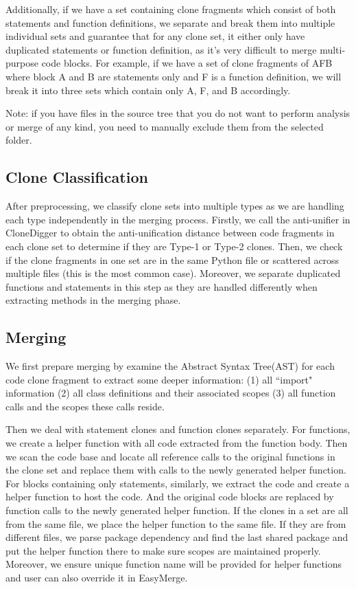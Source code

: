 \documentclass{acm_proc_article-sp}
\begin{document}
Additionally, if we have a set containing clone fragments which consist of both statements and function definitions, we separate and break them into multiple individual sets and guarantee that for any clone set, it either only have duplicated statements or function definition, as it's very difficult to merge multi-purpose code blocks.
For example, if we have a set of clone fragments of AFB where block A and B are statements only and F is a function definition, we will break it into three sets which
contain only A, F, and B accordingly.

Note: if you have files in the source tree that you do not want to perform analysis or merge of any kind, you need to manually exclude them from the selected folder.

\subsection{Clone Classification}
After preprocessing, we classify clone sets into multiple types as we are handling each type independently in the merging process. Firstly,
we call the anti-unifier in CloneDigger to obtain the anti-unification distance between code fragments in each clone set to determine if they
are Type-1 or Type-2 clones. Then, we check if the clone fragments in one set are in the same Python file or scattered across multiple files (this is the most common case).
Moreover, we separate duplicated functions and statements in this step as they are handled differently when extracting methods in the merging phase.

\subsection{Merging}
We first prepare merging by examine the Abstract Syntax Tree(AST) for each code clone fragment to extract some deeper information: (1) all ``import" information
(2) all class definitions and their associated scopes (3) all function calls and the scopes these calls reside. 

Then we deal with statement clones and function clones separately. For functions, we create a helper function with all code extracted from the function body.
Then we scan the code base and locate all reference calls to the original functions in the clone set and replace them with calls to the newly generated helper function.
For blocks containing only statements, similarly, we extract the code and create a helper function to host the code. And the original code blocks are replaced by
function calls to the newly generated helper function. If the clones in a set are all from the same file, we place the helper function to the same file. If they are 
from different files, we parse package dependency and find the last shared package and put the helper function there to make sure scopes are maintained properly.
Moreover, we ensure unique function name will be provided for helper functions and user can also override it in EasyMerge.
\end{document}
